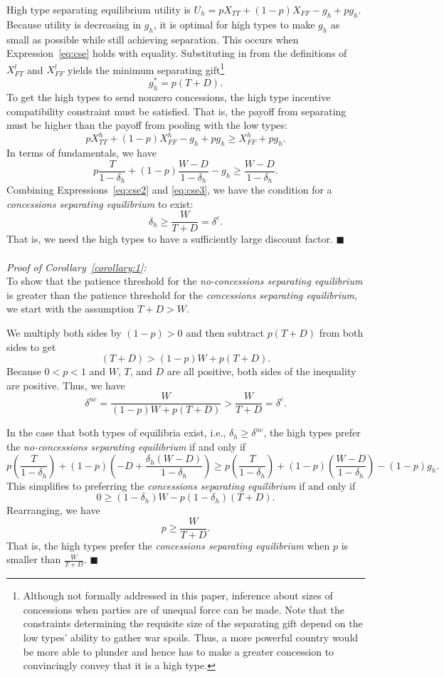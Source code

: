 \documentclass[bibtex,autowc]{apsr_submission}
\newcommand{\be}{\begin{equation}}
\newcommand{\ee}{\end{equation}}
\newcommand{\de}{\delta}
\begin{document}
{High type separating equilibrium utility is $U_h= pX_{TT}+(1-p)X_{FF} - g_h+pg_h$. Because utility is decreasing in $g_h$, it is optimal for high types to make $g_h$ as small as possible while still achieving separation. This occurs when Expression~\ref{eq:cse} holds with equality. Substituting in from the definitions of $X_{FT}^l$ and $X_{FF}^l$ yields the minimum separating gift\footnote {Although not formally addressed in this paper, inference about sizes of concessions when parties are of unequal force can be made. Note that the constraints determining the requisite size of the separating gift depend on the low types' ability to gather war spoils. Thus, a more powerful country would be more able to plunder and hence has to make a greater concession to convincingly convey that it is a high type.}
\be
	g_h^*=p(T+D).
	\label{eq:cse2}
\ee 
 To get the high types to send nonzero concessions, the high type incentive compatibility constraint must be satisfied. That is, the payoff from separating must be higher than the payoff from pooling with the low types: 
$$pX_{TT}^h+(1-p)X_{FF}^h - g_h +pg_h \geq X_{FF}^h +pg_h.$$
In terms of fundamentals, we have
\be
	p\frac{T}{1-\de_h}+(1-p)\frac{W-D}{1-\de_h} - g_h \geq \frac{W-D}{1-\de_h}.
	\label{eq:cse3}
\ee
Combining Expressions~\ref{eq:cse2} and \ref{eq:cse3}, we have the condition for a \emph{concessions separating equilibrium} to exist:
\be
\delta_h \geq \frac{W}{T+D} = \de^c.
\ee
That is, we need the high types to have a sufficiently large discount factor. \hfill $\blacksquare$\\
\\
\emph{Proof of Corollary~\ref{corollary:1}:}\\
To show that the patience threshold for the \emph{no-concessions separating equilibrium} is greater than the patience threshold for the \emph{concessions separating equilibrium}, we start with the assumption $T+D>W.$

We multiply both sides by $(1-p)>0$ and then subtract $p(T+D)$ from both sides to get
$$(T+D) > (1-p)W +p(T+D).$$
Because $0<p<1$ and $W$, $T$, and $D$ are all positive, both sides of the inequality are positive. Thus, we have
$$\de^{nc} = \frac{W}{(1-p)W +p(T+D)} > \frac{W}{T+D} = \de^{c}.$$

In the case that both types of equilibria exist, i.e., $\de_h \geq \de^{nc}$, the high types prefer the \emph{no-concessions separating equilibrium} if and only if
\begin{equation*}
p\left(\frac{T}{1- \delta_h}\right) +(1-p)\left({-D}+\frac{\delta_h(W-D)}{1- \delta_h} \right) \geq p\left(\frac{T}{1- \delta_h}\right)+(1-p)\left(\frac{W-D}{1- \delta_h}\right) - (1-p)g_h.
\end{equation*}
This simplifies to preferring the \emph{concessions separating equilibrium} if and only if
$$0 \geq (1-\de_h)W-p(1-\de_h)(T+D).$$
Rearranging, we have
\be
 p \geq \frac{W}{T+D}.
\ee
That is, the high types prefer the \emph{concessions separating equilibrium} when $p$ is smaller than $\frac{W}{T+D}$. \hfill $\blacksquare$

}
\end{document}
